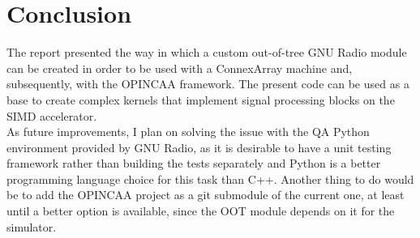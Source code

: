 \section{Conclusion}
\label{sec:conclusion}

The report presented the way in which a custom out-of-tree GNU Radio module can
be created in order to be used with a ConnexArray machine and, subsequently,
with the OPINCAA framework. The present code can be used as a base to create
complex kernels that implement signal processing blocks on the SIMD
accelerator.\\

As future improvements, I plan on solving the issue with the QA Python
environment provided by GNU Radio, as it is desirable to have a unit testing
framework rather than building the tests separately and Python is a better
programming language choice for this task than C++. Another thing to do would be
to add the OPINCAA project as a git submodule of the current one, at least until
a better option is available, since the OOT module depends on it for the
simulator.\\

